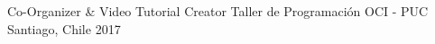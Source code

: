 \begin{cvhonors}
  \cvhonor
    {Co-Organizer \& Video Tutorial Creator}
    {Taller de Programación OCI - PUC}
    {Santiago, Chile}
    {2017}
\end{cvhonors}
